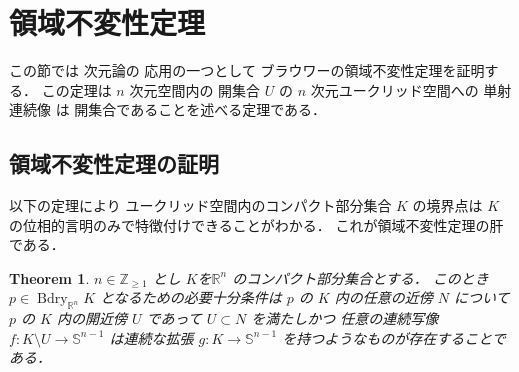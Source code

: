 \documentclass[leqno, a4paper, 12pt]{jsarticle}
\theoremstyle{plain}
\newtheorem{thm}{Theorem}[section]
\theoremstyle{definition}
\theoremstyle{remark}
\newcommand{\zz}{\mathbb{Z}}
\newcommand{\rr}{\mathbb{R}}
\DeclareMathOperator{\bd}{\mathrm{Bdry}}
\newcommand{\yospfont}[1]{\mathbb{#1}}
\newcommand{\yosphere}[1]{\yospfont{S}^{#1}}
\numberwithin{equation}{section}
\begin{document}
\section{領域不変性定理}\label{sec:invdom}
この節では
次元論の
応用の一つとして
ブラウワーの領域不変性定理を証明する．
この定理は
$n$
次元空間内の
開集合
$U$
の
$n$
次元ユークリッド空間への
単射連続像
は
開集合であることを述べる定理である．
\subsection{領域不変性定理の証明}\label{subsec:prfinvdom}
以下の定理により
ユークリッド空間内のコンパクト部分集合
$K$
の境界点は
$K$
の位相的言明のみで特徴付けできることがわかる．
これが領域不変性定理の肝である．
\begin{thm}\label{thm:26junbidaiji}
$n\in \zz_{\ge 1}$
とし
$K$を$\rr^{n}$
のコンパクト部分集合とする．
このとき
$p\in \bd_{\rr^{n}} K$
となるための必要十分条件は
$p$
の
$K$
内の任意の近傍
$N$
について
$p$
の
$K$
内の開近傍
$U$
であって
$U\subset N$
を満たしかつ
任意の連続写像
$f\colon K\setminus U\to \yosphere{n-1}$
は連続な拡張
$g\colon K\to \yosphere{n-1}$
を持つようなものが存在することである．
\end{thm}
\end{document}
